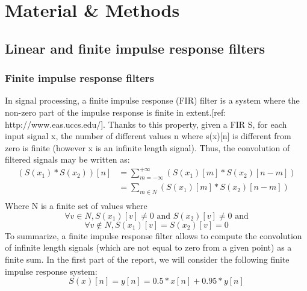 \documentclass[a4paper,10pt]{article}
\begin{document}
\section{Material \& Methods}
    \subsection{Linear and finite impulse response filters}
	\subsubsection{Finite impulse response filters}
	In signal processing, a finite impulse response (FIR) filter is a system where the non-zero part of the impulse response is finite in extent.[ref: http://www.eas.uccs.edu/].\newline
	Thanks to this property, given a FIR S, for each input signal x, the number of different values n where s(x)[n] is different from zero is finite (however x is an infinite length signal).
	Thus, the convolution of filtered signals may be written as:
	\begin{equation*}
	\begin{aligned}
	    (S(x_{1}) * S(x_{2}))[n]
	        &= \sum_{m=-\infty}^{+\infty} (S(x_{1})[m] * S(x_{2})[n-m]) \\
	        &= \sum_{m \in N} (S(x_{1})[m] * S(x_{2})[n-m]) \\
	\end{aligned}
	\end{equation*}
	Where N is a finite set of values where
	\begin{equation} \forall v \in N, S(x_{1})[v] \ne 0 \mbox{ and } S(x_{2})[v] \ne 0 \mbox{ and} \end{equation}
	\begin{equation} \forall v \notin N, S(x_{1})[v] = S(x_{2})[v] = 0 \end{equation}
	To summarize, a finite impulse response filter allows to compute the convolution of infinite length signals (which are not equal to zero from a given point) as a finite sum.\newline
	In the first part of the report, we will consider the following finite impulse response system:
	\begin{equation} S(x)[n] = y[n] = 0.5 * x[n] + 0.95 * y[n] \end{equation}
\end{document}
